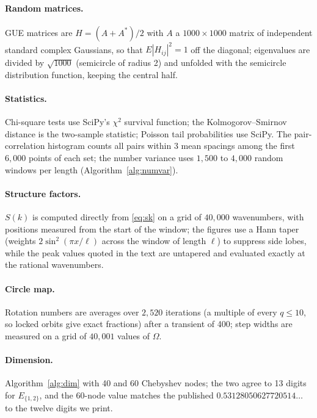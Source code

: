 \paragraph{Random matrices.} GUE matrices are $H = (A + A^*)/2$ with $A$ a $1000 \times 1000$ matrix of independent standard complex Gaussians, so that $E|H_{ij}|^2 = 1$ off the diagonal; eigenvalues are divided by $\sqrt{1000}$ (semicircle of radius 2) and unfolded with the semicircle distribution function, keeping the central half.

\paragraph{Statistics.} Chi-square tests use SciPy's $\chi^2$ survival function; the Kolmogorov--Smirnov distance is the two-sample statistic; Poisson tail probabilities use SciPy. The pair-correlation histogram counts all pairs within 3 mean spacings among the first $6{,}000$ points of each set; the number variance uses $1{,}500$ to $4{,}000$ random windows per length (Algorithm~\ref{alg:numvar}).

\paragraph{Structure factors.} $S(k)$ is computed directly from \eqref{eq:sk} on a grid of $40{,}000$ wavenumbers, with positions measured from the start of the window; the figures use a Hann taper (weights $2\sin^2(\pi x/\ell)$ across the window of length $\ell$) to suppress side lobes, while the peak values quoted in the text are untapered and evaluated exactly at the rational wavenumbers.

\paragraph{Circle map.} Rotation numbers are averages over $2{,}520$ iterations (a multiple of every $q \le 10$, so locked orbits give exact fractions) after a transient of 400; step widths are measured on a grid of $40{,}001$ values of $\Omega$.

\paragraph{Dimension.} Algorithm~\ref{alg:dim} with 40 and 60 Chebyshev nodes; the two agree to 13 digits for $E_{\{1,2\}}$, and the 60-node value matches the published $0.53128050627720514\ldots$ \citep{JenkinsonPollicott2018} to the twelve digits we print.
